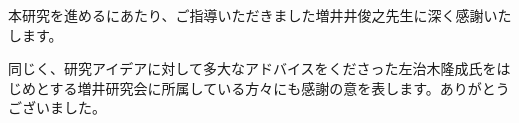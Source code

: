 \begin{acknowledgment}

本研究を進めるにあたり、ご指導いただきました増井井俊之先生に深く感謝いたします。

同じく、研究アイデアに対して多大なアドバイスをくださった左治木隆成氏をはじめとする増井研究会に所属している方々にも感謝の意を表します。ありがとうございました。

\end{acknowledgment}
